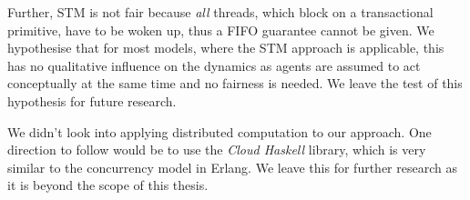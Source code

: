 Further, STM is not fair because \textit{all} threads, which block on a transactional primitive, have to be woken up, thus a FIFO guarantee cannot be given. We hypothesise that for most models, where the STM approach is applicable, this has no qualitative influence on the dynamics as agents are assumed to act conceptually at the same time and no fairness is needed. We leave the test of this hypothesis for future research.

We didn't look into applying distributed computation to our approach. One direction to follow would be to use the \textit{Cloud Haskell} library, which is very similar to the concurrency model in Erlang. We leave this for further research as it is beyond the scope of this thesis.

